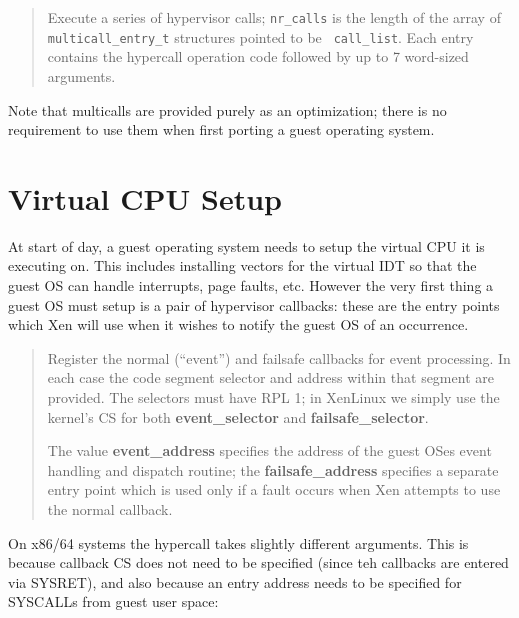 \documentclass[11pt,twoside,final,openright]{report}
\newcommand{\hypercall}[1]{\vspace{2mm}{\sf #1}}
\begin{document}
\begin{quote}
\hypercall{multicall(void *call\_list, int nr\_calls)}

Execute a series of hypervisor calls; {\tt nr\_calls} is the length of
the array of {\tt multicall\_entry\_t} structures pointed to be {\tt
call\_list}. Each entry contains the hypercall operation code followed
by up to 7 word-sized arguments.
\end{quote}

Note that multicalls are provided purely as an optimization; there is
no requirement to use them when first porting a guest operating
system.


\section{Virtual CPU Setup} 

At start of day, a guest operating system needs to setup the virtual
CPU it is executing on. This includes installing vectors for the
virtual IDT so that the guest OS can handle interrupts, page faults,
etc. However the very first thing a guest OS must setup is a pair 
of hypervisor callbacks: these are the entry points which Xen will
use when it wishes to notify the guest OS of an occurrence. 

\begin{quote}
\hypercall{set\_callbacks(unsigned long event\_selector, unsigned long
  event\_address, unsigned long failsafe\_selector, unsigned long
  failsafe\_address) }

Register the normal (``event'') and failsafe callbacks for 
event processing. In each case the code segment selector and 
address within that segment are provided. The selectors must
have RPL 1; in XenLinux we simply use the kernel's CS for both 
{\bf event\_selector} and {\bf failsafe\_selector}.

The value {\bf event\_address} specifies the address of the guest OSes
event handling and dispatch routine; the {\bf failsafe\_address}
specifies a separate entry point which is used only if a fault occurs
when Xen attempts to use the normal callback. 

\end{quote} 

On x86/64 systems the hypercall takes slightly different
arguments. This is because callback CS does not need to be specified
(since teh callbacks are entered via SYSRET), and also because an
entry address needs to be specified for SYSCALLs from guest user
space:
\end{document}
